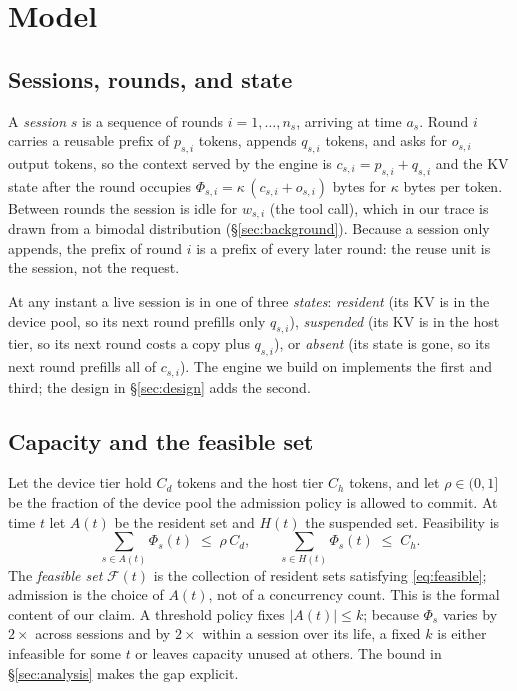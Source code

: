 \section{Model}
\label{sec:model}

\subsection{Sessions, rounds, and state}

A \emph{session} $s$ is a sequence of rounds $i=1,\dots,n_s$, arriving at time $a_s$.
Round $i$ carries a reusable prefix of $p_{s,i}$ tokens, appends $q_{s,i}$ tokens, and
asks for $o_{s,i}$ output tokens, so the context served by the engine is
$c_{s,i}=p_{s,i}+q_{s,i}$ and the KV state after the round occupies
$\Phi_{s,i}=\kappa\,(c_{s,i}+o_{s,i})$ bytes for $\kappa$ bytes per token. Between rounds
the session is idle for $w_{s,i}$ (the tool call), which in our trace is drawn from a
bimodal distribution (\S\ref{sec:background}). Because a session only appends, the prefix
of round $i$ is a prefix of every later round: the reuse unit is the session, not the
request.

At any instant a live session is in one of three \emph{states}: \emph{resident} (its KV is
in the device pool, so its next round prefills only $q_{s,i}$), \emph{suspended} (its KV
is in the host tier, so its next round costs a copy plus $q_{s,i}$), or \emph{absent} (its
state is gone, so its next round prefills all of $c_{s,i}$). The engine we build on
implements the first and third; the design in \S\ref{sec:design} adds the second.

\subsection{Capacity and the feasible set}

Let the device tier hold $C_d$ tokens and the host tier $C_h$ tokens, and let $\rho\in(0,1]$
be the fraction of the device pool the admission policy is allowed to commit. At time $t$
let $A(t)$ be the resident set and $H(t)$ the suspended set. Feasibility is
\begin{equation}
\sum_{s\in A(t)}\Phi_s(t)\;\le\;\rho\,C_d,
\qquad
\sum_{s\in H(t)}\Phi_s(t)\;\le\;C_h .
\label{eq:feasible}
\end{equation}
The \emph{feasible set} $\mathcal{F}(t)$ is the collection of resident sets satisfying
\eqref{eq:feasible}; admission is the choice of $A(t)$, not of a concurrency count. This is
the formal content of our claim. A threshold policy fixes $|A(t)|\le k$; because
$\Phi_s$ varies by $2\times$ across sessions and by $2\times$ within a session over its
life, a fixed $k$ is either infeasible for some $t$ or leaves capacity unused at others.
The bound in \S\ref{sec:analysis} makes the gap explicit.

